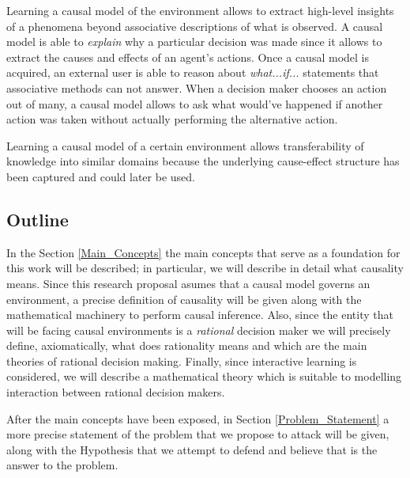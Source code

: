 \documentclass[english,letterpaper,12pt,final]{article}
\theoremstyle{definition}
\begin{document}

Learning a causal model of the environment allows to extract high-level insights of a phenomena beyond associative descriptions of what is observed. A causal model is able to \textit{explain} why a particular decision was made since it allows to extract the causes and effects of an agent's actions. Once a causal model is acquired, an external user is able to reason about \textit{what...if...} statements that associative methods can not answer. When a decision maker chooses an action out of many, a causal model allows to ask what would've happened if another action was taken without actually performing the alternative action.

Learning a causal model of a certain environment allows transferability of knowledge into similar domains because the underlying cause-effect structure has been captured and could later be used.
\subsection{Outline}
In the Section \ref{Main_Concepts} the main concepts that serve as a foundation for this work will be described; in particular, we will describe in detail what causality means. Since this research proposal asumes that a causal model governs an environment, a precise definition of causality will be given along with the mathematical machinery to perform causal inference. Also, since the entity that will be facing causal environments is a \textit{rational} decision maker we will precisely define, axiomatically, what does rationality means and which are the main theories of rational decision making. Finally, since interactive learning is considered, we will describe a mathematical theory which is suitable to modelling interaction between rational decision makers.

After the main concepts have been exposed, in Section \ref{Problem_Statement} a more precise statement of the problem that we propose to attack will be given, along with the Hypothesis that we attempt to defend and believe that is the answer to the problem.
\end{document}
